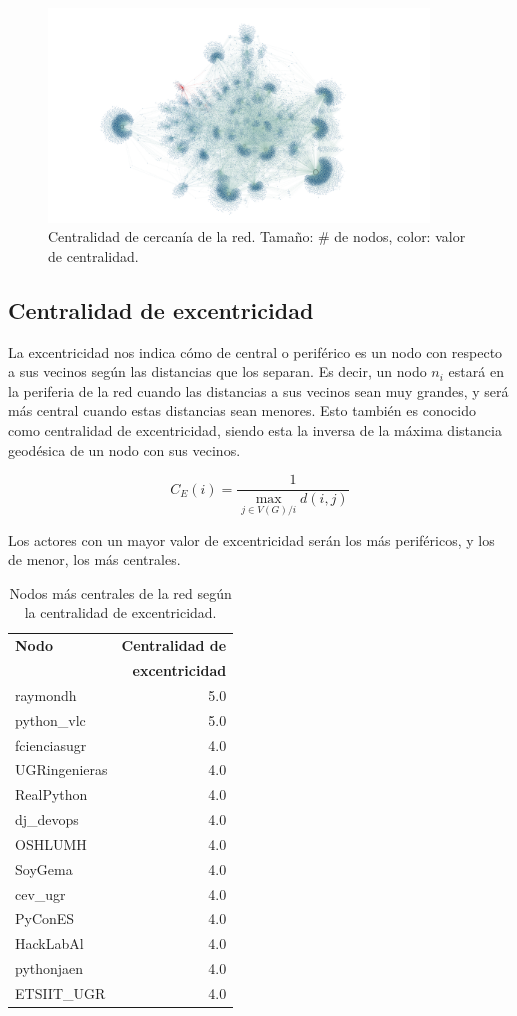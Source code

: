 \documentclass[paper=a4, fontsize=11pt]{article} %
\numberwithin{equation}{section} %
\numberwithin{figure}{section} %
\numberwithin{table}{section} %
\begin{document}
\begin{figure}[H]
  \centering
  \includegraphics[width=0.9\textwidth]{Visualizaciones/close}
  \caption{Centralidad de cercanía de la red. Tamaño: \# de nodos, color: valor de centralidad.}
  \label{im4}
\end{figure}


\subsection{Centralidad de excentricidad}

La excentricidad nos indica cómo de central o periférico es un nodo con respecto a sus vecinos según las distancias que los separan. Es decir, un nodo $n_i$ estará en la periferia de la red cuando las distancias a sus vecinos sean muy grandes, y será más central cuando estas distancias sean menores. Esto también es conocido como centralidad de excentricidad, siendo esta la inversa de la máxima distancia geodésica de un nodo con sus vecinos.

\begin{displaymath}
  C_E(i) = \frac{1}{\max_{j \in V(G)/i}d(i,j)}
\end{displaymath}

Los actores con un mayor valor de excentricidad serán los más periféricos, y los de menor, los más centrales.

\begin{table}[H]
\begin{tabular}{l|r}
\textbf{Nodo} & \textbf{Centralidad de} \\
& \textbf{excentricidad} \\
\hline
raymondh & 5.0 \\
python\_vlc & 5.0 \\
fcienciasugr & 4.0 \\
UGRingenieras & 4.0 \\
RealPython & 4.0 \\
dj\_devops & 4.0 \\
OSHLUMH & 4.0 \\
SoyGema & 4.0 \\
cev\_ugr & 4.0 \\
PyConES & 4.0 \\
HackLabAl & 4.0 \\
pythonjaen & 4.0 \\
ETSIIT\_UGR & 4.0 \\
\end{tabular}
\label{eccen}
\caption{Nodos más centrales de la red según la centralidad de excentricidad.}
\end{table}
\end{document}
